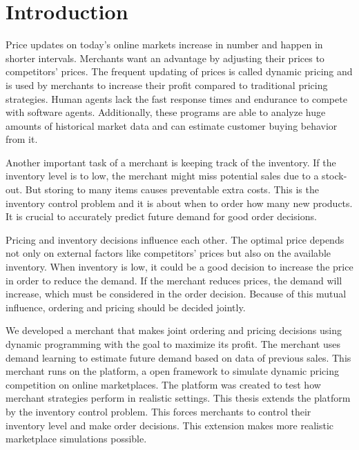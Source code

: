 
\chapter{Introduction}
Price updates on today's online markets increase in number and happen in shorter intervals.
Merchants want an advantage by adjusting their prices to competitors' prices.
The frequent updating of prices is called dynamic pricing and is used by merchants to increase their profit compared to traditional pricing strategies.
Human agents lack the fast response times and endurance to compete with software agents.
Additionally, these programs are able to analyze huge amounts of historical market data and can estimate customer buying behavior from it.

Another important task of a merchant is keeping track of the inventory.
If the inventory level is to low, the merchant might miss potential sales due to a stock-out.
But storing to many items causes preventable extra costs.
This is the inventory control problem and it is about when to order how many new products.
It is crucial to accurately predict future demand for good order decisions.

Pricing and inventory decisions influence each other.
The optimal price depends not only on external factors like competitors' prices but also on the available inventory.
When inventory is low, it could be a good decision to increase the price in order to reduce the demand.
If the merchant reduces prices, the demand will increase, which must be considered in the order decision.
Because of this mutual influence, ordering and pricing should be decided jointly.

We developed a merchant that makes joint ordering and pricing decisions using dynamic programming with the goal to maximize its profit.
The merchant uses demand learning to estimate future demand based on data of previous sales.
This merchant runs on the \pricewars platform, a open framework to simulate dynamic pricing competition on online marketplaces.
The platform was created to test how merchant strategies perform in realistic settings.
This thesis extends the platform by the inventory control problem.
This forces merchants to control their inventory level and make order decisions.
This extension makes more realistic marketplace simulations possible.

